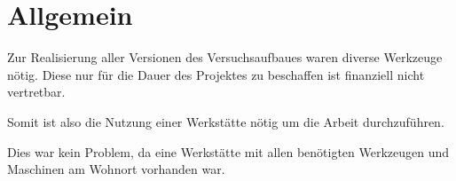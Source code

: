 \section{Allgemein}

Zur Realisierung aller Versionen des Versuchsaufbaues waren diverse Werkzeuge nötig.
Diese nur für die Dauer des Projektes zu beschaffen ist finanziell nicht vertretbar.

Somit ist also die Nutzung einer Werkstätte nötig um die Arbeit durchzuführen.

Dies war kein Problem, da eine Werkstätte mit allen benötigten Werkzeugen und Maschinen am Wohnort vorhanden war.